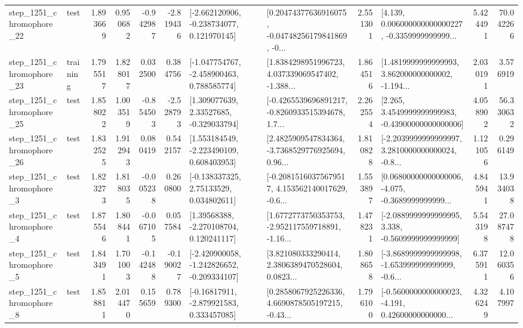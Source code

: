 \begin{tabular}{llrrrrllrlrr}
 step\_1251\_chromophore\_22 &      test &      1.893669 &    0.950682 &     -0.942987 & -2.819436 &   [-2.662120906, -0.238734077, 0.121970145] &  [0.20474377636916075, -0.04748256179841869, -0... &       2.551301 &  [4.139, 0.006000000000000227, -0.3359999999999... &            5.424491 &         70.042266 \\
 step\_1251\_chromophore\_23 &  training &      1.795517 &    1.828017 &      0.032500 &  0.384756 &   [-1.047754767, -2.458900463, 0.788585774] &  [1.8384298951996723, 4.037339069547402, -1.388... &       1.864516 &  [1.4819999999999993, 3.862000000000002, -1.194... &            2.030191 &          3.576919 \\
 step\_1251\_chromophore\_25 &      test &      1.858022 &    1.003519 &     -0.854503 & -2.528793 &     [1.309077639, 2.33527685, -0.329033794] &  [-0.4265539696891217, -0.8260933515394678, 1.7... &       2.262554 &  [2.265, 3.4549999999999983, -0.43900000000000006] &            4.058902 &         56.330632 \\
 step\_1251\_chromophore\_26 &      test &      1.832525 &    1.912943 &      0.080419 &  0.542157 &    [1.553184549, -2.223490109, 0.608403953] &  [2.4825909547834364, -3.7368529776925694, 0.96... &       1.810828 &  [-2.2039999999999997, 3.2810000000000024, -0.8... &            1.121056 &          0.296149 \\
  step\_1251\_chromophore\_3 &      test &      1.823273 &    1.818035 &     -0.005238 &  0.260800 &     [-0.138337325, 2.75133529, 0.034802611] &  [-0.20815160375679517, 4.153562140017629, -0.6... &       1.553897 &  [0.06800000000000006, -4.075, -0.3689999999999... &            4.845941 &         13.934038 \\
  step\_1251\_chromophore\_4 &      test &      1.875546 &    1.808441 &     -0.067105 &  0.057584 &     [1.39568388, -2.270108704, 0.120241117] &  [1.6772773750353753, -2.952117559718891, -1.16... &       1.478231 &  [-2.0889999999999995, 3.338, -0.5609999999999999] &            5.543198 &         27.087478 \\
  step\_1251\_chromophore\_5 &      test &      1.843491 &    1.701003 &     -0.142488 & -0.190027 &  [-2.420900058, -1.242826652, -0.209334107] &  [3.821080333290414, 2.3806389470528604, 0.0823... &       1.808658 &  [-3.8689999999999998, -1.653999999999999, -0.6... &            6.375911 &         12.060356 \\
  step\_1251\_chromophore\_8 &      test &      1.858811 &    2.014470 &      0.155659 &  0.789300 &    [-0.16817911, -2.879921583, 0.333457085] &  [0.2858067925226336, 4.6690878505197215, -0.43... &       1.796100 &  [-0.5600000000000023, -4.191, 0.42600000000000... &            4.326249 &          4.107997 \\

\end{tabular}
